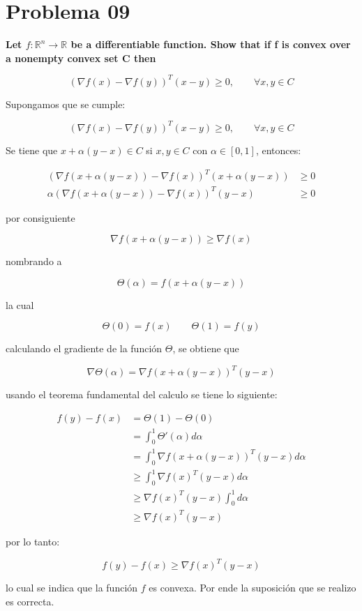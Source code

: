\section*{Problema 09}

\textbf{Let $f : \mathbb{R}^n \rightarrow \mathbb{R}$ be a differentiable function. Show that if f is convex over a nonempty convex set C then}

\begin{equation*}
    (\nabla f(x)-\nabla f(y))^T (x-y) \geq 0, \qquad \forall x,y \in C
\end{equation*}


Supongamos que se cumple:

\begin{equation*}
    (\nabla f(x)-\nabla f(y))^T (x-y) \geq 0, \qquad \forall x,y \in C
\end{equation*}

Se tiene que $x+\alpha(y-x) \in C$  si $x,y\in C$ con $\alpha \in [0,1]$, entonces:

\begin{align*}
    (\nabla f(x+\alpha(y-x)) - \nabla f(x))^T (x+\alpha (y-x)) & \geq 0 \\
    \alpha (\nabla f(x+\alpha(y-x)) - \nabla f(x))^T (y-x)     & \geq 0
\end{align*}

por consiguiente

\begin{equation*}
    \nabla f(x+\alpha (y-x))  \geq \nabla f(x)
\end{equation*}

nombrando a

\begin{equation*}
    \Theta (\alpha) = f(x+\alpha (y-x))
\end{equation*}

la cual

\begin{equation*}
    \Theta(0) = f(x) \qquad \Theta(1) = f(y)
\end{equation*}

calculando el gradiente de la función $\Theta$, se obtiene que

\begin{equation*}
    \nabla \Theta (\alpha) =  \nabla f (x+\alpha (y-x))^T (y-x)
\end{equation*}

usando el teorema fundamental del calculo se tiene lo siguiente:

\begin{align*}
    f(y)-f(x) & = \Theta(1) - \Theta(0)                            \\
              & = \int_0^1 \Theta'(\alpha) d\alpha                 \\
              & = \int_0^1 \nabla f(x+\alpha (y-x))^T(y-x) d\alpha \\
              & \geq \int_0^1 \nabla f(x)^T (y-x) d\alpha          \\
              & \geq \nabla f(x)^T(y-x) \int_0^1 d\alpha           \\
              & \geq \nabla f(x)^T(y-x)
\end{align*}

por lo tanto:

\begin{equation*}
    f(y)-f(x) \geq \nabla f(x)^T(y-x)
\end{equation*}

lo cual se indica que la función $f$ es convexa. Por ende la suposición que se realizo es correcta.